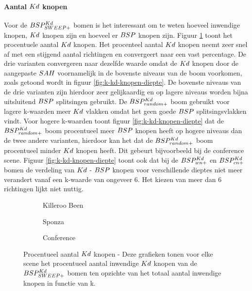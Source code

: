 \paragraph{Aantal $\symKd$ knopen}
Voor de $BSP^{Kd}_{SWEEP+}$ bomen is het interessant om te weten hoeveel inwendige knopen, $\symKd$ knopen zijn en hoeveel er $BSP$ knopen zijn.
Figuur \ref{fig:k-kd-knopen} toont het procentuele aantal $\symKd$ knopen.
Het procenteel aantal $\symKd$ knopen neemt zeer snel af met een stijgend aantal richtingen en convergeert naar een vast percentage.
De drie varianten convergeren naar dezelfde waarde omdat de $\symKd$ knopen door de aangepaste $SAH$ voornamelijk in de bovenste niveaus van de boom voorkomen, zoals getoond wordt in figuur \ref{fig:k-kd-knopen-diepte}.
De bovenste niveaus van de drie varianten zijn hierdoor zeer gelijkaardig en op lagere niveaus worden bijna uitsluitend $BSP$ splitsingen gebruikt.
De $BSP^{Kd}_{random+}$ boom gebruikt voor lagere k-waarden meer $\symKd$ vlakken omdat het geen goede $BSP$ splitsingsvlakken vindt.
Voor hogere k-waarden toont figuur \ref{fig:k-kd-knopen-diepte} dat de $BSP^{Kd}_{random+}$ boom procentueel meer $BSP$ knopen heeft op hogere niveaus dan de twee andere varianten, hierdoor kan het dat de $BSP^{Kd}_{random+}$ boom procentueel minder $\symKd$ knopen heeft.
Dit gebeurt bijvoorbeeld bij de conference scene.
Figuur \ref{fig:k-kd-knopen-diepte} toont ook dat bij de $BSP^{Kd}_{wn+}$ en $BSP^{Kd}_{cn+}$ bomen de verdeling van $\symKd$ - $BSP$ knopen voor verschillende dieptes niet meer verandert vanaf een k-waarde van ongeveer 6.
Het kiezen van meer dan 6 richtingen lijkt niet nuttig.

\begin{figure}[h]
  \centering
  \begin{subfigure}[t]{.32\linewidth}
    \centering
{}
\caption{Killeroo Been}
  \end{subfigure}
  \begin{subfigure}[t]{.32\linewidth}
    \centering
{}
\caption{Sponza}
\end{subfigure}
\begin{subfigure}[t]{.32\linewidth}
  \centering
{}
\caption{Conference}
\end{subfigure}
\caption[Procentueel aantal $\symKd$ knopen]{Procentueel aantal $\symKd$ knopen - \small Deze grafieken tonen voor elke scene het procentueel aantal inwendige $\symKd$ knopen van de $BSP^{Kd}_{SWEEP+}$ bomen ten opzichte van het totaal aantal inwendige knopen in functie van k.}
\label{fig:k-kd-knopen}
\end{figure}


